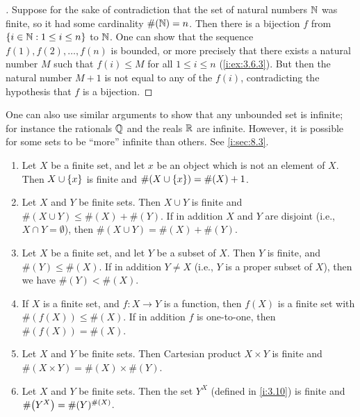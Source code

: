 \begin{proof}[]
  Suppose for the sake of contradiction that the set of natural numbers \(\mathbb{N}\) was finite, so it had some cardinality \(\#(\mathbb{N}) = n\).
  Then there is a bijection \(f\) from \(\left\lbrace i \in \mathbb{N} : 1 \leq i \leq n\right\rbrace\) to \(\mathbb{N}\).
  One can show that the sequence \(f(1), f(2), \dots, f(n)\) is bounded, or more precisely that there exists a natural number \(M\) such that \(f(i) \leq M\) for all \(1 \leq i \leq n\) (\cref{i:ex:3.6.3}).
  But then the natural number \(M+1\) is not equal to any of the \(f(i)\), contradicting the hypothesis that \(f\) is a bijection.
\end{proof}

\begin{rmk}\label{i:3.6.13}
  One can also use similar arguments to show that any unbounded set is infinite;
  for instance the rationals \(\mathbb{Q}\) and the reals \(\mathbb{R}\) are infinite.
  However, it is possible for some sets to be ``more'' infinite than others.
  See \cref{i:sec:8.3}.
\end{rmk}

\begin{prop}\label{i:3.6.14}
  \begin{enumerate}
    \item Let \(X\) be a finite set, and let \(x\) be an object which is not an element of \(X\).
          Then \(X \cup \left\lbrace x\right\rbrace\) is finite and \(\#(X \cup \left\lbrace x\right\rbrace) = \#(X) + 1\).
    \item Let \(X\) and \(Y\) be finite sets.
          Then \(X \cup Y\) is finite and \(\#(X \cup Y) \leq \#(X) + \#(Y)\).
          If in addition \(X\) and \(Y\) are disjoint (i.e., \(X \cap Y = \emptyset\)), then \(\#(X \cup Y) = \#(X) + \#(Y)\).
    \item Let \(X\) be a finite set, and let \(Y\) be a subset of \(X\).
          Then \(Y\) is finite, and \(\#(Y) \leq \#(X)\).
          If in addition \(Y \neq X\) (i.e., \(Y\) is a proper subset of \(X\)), then we have \(\#(Y) < \#(X)\).
    \item If \(X\) is a finite set, and \(f : X \to Y\) is a function, then \(f(X)\) is a finite set with \(\#(f(X)) \leq \#(X)\).
          If in addition \(f\) is one-to-one, then \(\#(f(X)) = \#(X)\).
    \item Let \(X\) and \(Y\) be finite sets.
          Then Cartesian product \(X \times Y\) is finite and \(\#(X \times Y) = \#(X) \times \#(Y)\).
    \item Let \(X\) and \(Y\) be finite sets.
          Then the set \(Y^X\) (defined in \cref{i:3.10}) is finite and \(\#\pa{Y^X} = \#(Y)^{\#(X)}\).
  \end{enumerate}
\end{prop}

